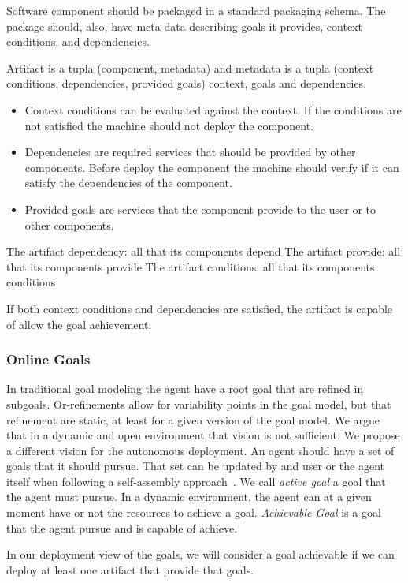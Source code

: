 Software component should be packaged in a standard packaging schema.
The package should, also, have meta-data describing goals it provides, context conditions, and dependencies.

Artifact is a tupla (component, metadata) and metadata is a tupla (context conditions, dependencies, provided goals) context, goals and dependencies.

\begin{itemize}
  \item Context conditions can be evaluated against the context. If the conditions are not satisfied the machine should not deploy the component.
  \item Dependencies are required services that should be provided by other components. Before deploy the component the machine should verify if it can satisfy the dependencies of the component.
  \item Provided goals are services that the component provide to the user or to other components.
\end{itemize}

The artifact dependency: all that its components depend
The artifact provide:  all that its components provide
The artifact conditions:  all that its components conditions

If both context conditions and dependencies are satisfied, the artifact is capable of allow the goal achievement.

\subsubsection{Online Goals}

In traditional goal modeling the agent have a root goal that are refined in subgoals.  Or-refinements allow for variability points in the goal model, but that refinement are static, at least for a given version of the goal model.
We argue that in a dynamic and open environment that vision is not sufficient. We propose a different vision for the autonomous deployment. An agent should have a set of goals that it should pursue. That set can be updated by and user or the agent itself when following a self-assembly approach~\cite{sykes_flashmob:_2011}. We call \emph{active goal} a goal that the agent must pursue.
In a dynamic environment, the agent can at a given moment have or not the resources to achieve a goal. \emph{Achievable Goal} is a goal that the agent pursue and is capable of achieve.

In our deployment view of the goals, we will consider a goal achievable if we can deploy at least one artifact that provide that goals.

